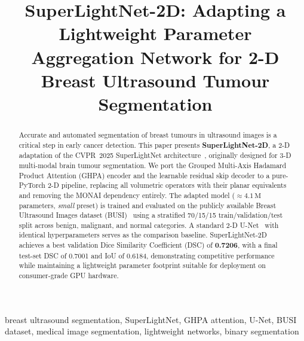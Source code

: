 \documentclass[conference]{IEEEtran}
\begin{document}
\title{SuperLightNet-2D: Adapting a Lightweight Parameter Aggregation
Network for 2-D Breast Ultrasound Tumour Segmentation}

\author{
}

\maketitle

\begin{abstract}
Accurate and automated segmentation of breast tumours in ultrasound
images is a critical step in early cancer detection. This paper presents
\textbf{SuperLightNet-2D}, a 2-D adaptation of the CVPR~2025
SuperLightNet architecture~\cite{yu2025superlightnet}, originally
designed for 3-D multi-modal brain tumour segmentation. We port the
Grouped Multi-Axis Hadamard Product Attention (GHPA) encoder and the
learnable residual skip decoder to a pure-PyTorch 2-D pipeline,
replacing all volumetric operators with their planar equivalents and
removing the MONAI dependency entirely. The adapted model
($\approx 4.1\,\text{M}$ parameters, \textit{small} preset) is
trained and evaluated on the publicly available Breast Ultrasound
Images dataset (BUSI)~\cite{al2020dataset} using a stratified
70/15/15 train/validation/test split across benign, malignant, and
normal categories. A standard 2-D U-Net~\cite{ronneberger2015u} with
identical hyperparameters serves as the comparison baseline.
SuperLightNet-2D achieves a best validation Dice Similarity
Coefficient (DSC) of \textbf{0.7206}, with a final test-set DSC of
0.7001 and IoU of 0.6184, demonstrating competitive performance
while maintaining a lightweight parameter footprint suitable for
deployment on consumer-grade GPU hardware.
\end{abstract}

\begin{IEEEkeywords}
breast ultrasound segmentation, SuperLightNet, GHPA attention,
U-Net, BUSI dataset, medical image segmentation, lightweight networks,
binary segmentation
\end{IEEEkeywords}

\end{document}
